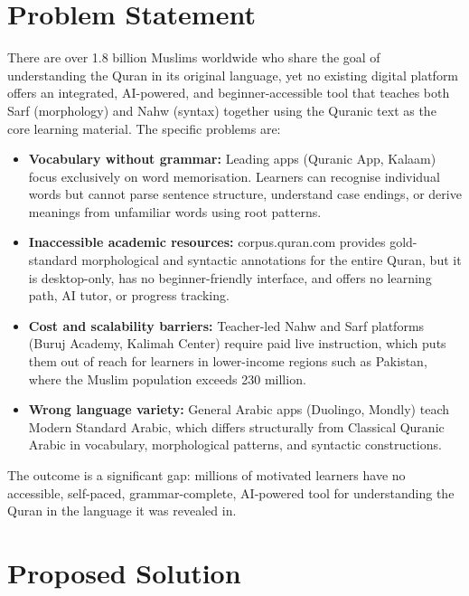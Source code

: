 \documentclass[A4paper,12pt]{article}
\begin{document}
\section{Problem Statement}

There are over 1.8 billion Muslims worldwide who share the goal of understanding the Quran in
its original language, yet no existing digital platform offers an integrated, AI-powered, and
beginner-accessible tool that teaches both Sarf (morphology) and Nahw (syntax) together using
the Quranic text as the core learning material. The specific problems are:

\begin{itemize}[leftmargin=1.5em]
    \item \textbf{Vocabulary without grammar:} Leading apps (Quranic App, Kalaam) focus exclusively
    on word memorisation. Learners can recognise individual words but cannot parse sentence
    structure, understand case endings, or derive meanings from unfamiliar words using root
    patterns.

    \item \textbf{Inaccessible academic resources:} corpus.quran.com provides gold-standard
    morphological and syntactic annotations for the entire Quran, but it is desktop-only, has
    no beginner-friendly interface, and offers no learning path, AI tutor, or progress tracking.

    \item \textbf{Cost and scalability barriers:} Teacher-led Nahw and Sarf platforms (Buruj Academy,
    Kalimah Center) require paid live instruction, which puts them out of reach for learners in
    lower-income regions such as Pakistan, where the Muslim population exceeds 230 million.

    \item \textbf{Wrong language variety:} General Arabic apps (Duolingo, Mondly) teach Modern
    Standard Arabic, which differs structurally from Classical Quranic Arabic in vocabulary,
    morphological patterns, and syntactic constructions.
\end{itemize}

The outcome is a significant gap: millions of motivated learners have no accessible, self-paced,
grammar-complete, AI-powered tool for understanding the Quran in the language it was revealed in.

\section{Proposed Solution}
\end{document}
